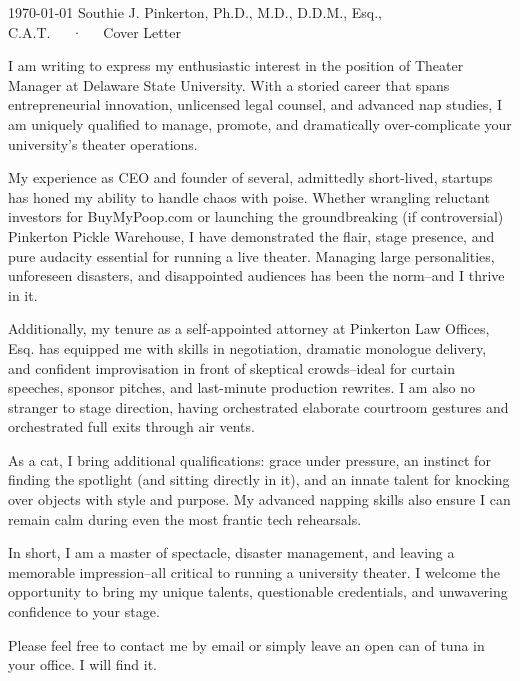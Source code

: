 \documentclass[11pt, a4paper]{awesome-cv}
\begin{document}
\makecvheader[R]

\makecvfooter
  {\today}
  {Southie J. Pinkerton, Ph.D., M.D., D.D.M., Esq., C.A.T.~~~·~~~Cover Letter}
  {}

\makelettertitle

\begin{cvletter}

I am writing to express my enthusiastic interest in the position of Theater Manager
at Delaware State University. With a storied career that spans entrepreneurial innovation,
unlicensed legal counsel, and advanced nap studies, I am uniquely qualified to manage,
promote, and dramatically over-complicate your university's theater operations.

My experience as CEO and founder of several, admittedly short-lived, startups has honed
my ability to handle chaos with poise. Whether wrangling reluctant investors for BuyMyPoop.com
or launching the groundbreaking (if controversial) Pinkerton Pickle Warehouse, I have
demonstrated the flair, stage presence, and pure audacity essential for running a
live theater. Managing large personalities, unforeseen disasters, and disappointed
audiences has been the norm--and I thrive in it.

Additionally, my tenure as a self-appointed attorney at Pinkerton Law Offices, Esq.
has equipped me with skills in negotiation, dramatic monologue delivery, and confident
improvisation in front of skeptical crowds--ideal for curtain speeches, sponsor pitches,
and last-minute production rewrites. I am also no stranger to stage direction,
having orchestrated elaborate courtroom gestures and orchestrated full exits through air vents.

As a cat, I bring additional qualifications: grace under pressure, an instinct for
finding the spotlight (and sitting directly in it), and an innate talent for knocking over
objects with style and purpose. My advanced napping skills also ensure I can remain calm
during even the most frantic tech rehearsals.

In short, I am a master of spectacle, disaster management, and leaving a memorable
impression--all critical to running a university theater. I welcome the opportunity
to bring my unique talents, questionable credentials, and unwavering confidence to your stage.

Please feel free to contact me by email or simply leave an open can of tuna in your
office. I will find it.

\end{cvletter}


\makeletterclosing
\end{document}

